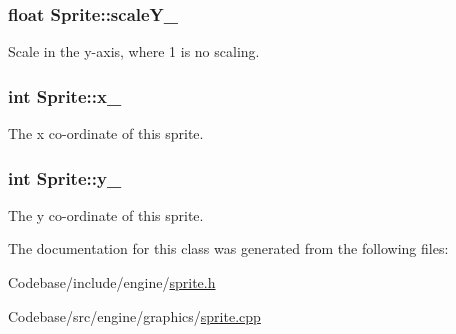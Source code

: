 \hypertarget{class_sprite_a26863cb8bcd854eb4f4c8777a79ce379}{
\subsubsection[{scale\-Y\-\_\-}]{\setlength{\rightskip}{0pt plus 5cm}float {\bf Sprite\-::scale\-Y\-\_\-}}}\label{class_sprite_a26863cb8bcd854eb4f4c8777a79ce379}


Scale in the y-\/axis, where 1 is no scaling. 

\hypertarget{class_sprite_ae4b1f0a19b406ffccc78e18f5e40e6f6}{
\subsubsection[{x\-\_\-}]{\setlength{\rightskip}{0pt plus 5cm}int {\bf Sprite\-::x\-\_\-}}}\label{class_sprite_ae4b1f0a19b406ffccc78e18f5e40e6f6}


The x co-\/ordinate of this sprite. 

\hypertarget{class_sprite_afd9f444fcd6f2d3d6bb0d7686e09d16e}{
\subsubsection[{y\-\_\-}]{\setlength{\rightskip}{0pt plus 5cm}int {\bf Sprite\-::y\-\_\-}}}\label{class_sprite_afd9f444fcd6f2d3d6bb0d7686e09d16e}


The y co-\/ordinate of this sprite. 



The documentation for this class was generated from the following files\-:\begin{DoxyCompactItemize}
\item 
Codebase/include/engine/\hyperlink{_codebase_2include_2engine_2sprite_8h}{sprite.\-h}\item 
Codebase/src/engine/graphics/\hyperlink{sprite_8cpp}{sprite.\-cpp}\end{DoxyCompactItemize}
